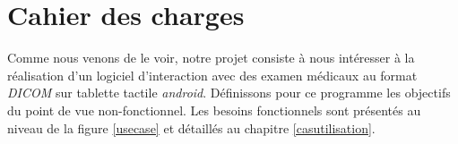 \chapter{Cahier des charges}
\minitoc

Comme nous venons de le voir, notre projet consiste à nous intéresser à la réalisation d'un logiciel d'interaction avec des examen médicaux au format \emph{DICOM} sur tablette tactile \emph{android}. Définissons pour ce programme les objectifs du point de vue non-fonctionnel. Les besoins fonctionnels sont présentés au niveau de la figure \vref{usecase} et détaillés au chapitre \vref{casutilisation}.


